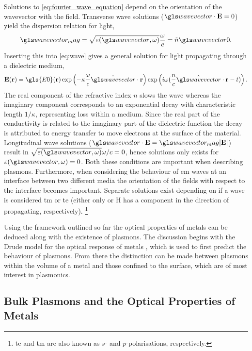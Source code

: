 \documentclass{article}
\begin{document}
Solutions to \eqref{eq:fourier_wave_equation} depend on the orientation of the wavevector with the field. Transverse wave solutions ($\wv\cdot\vec{E}=0$) yield the dispersion relation for light,
\begin{equation}
	\wvm = \sqrt{\eps(\wv, \omega)}\frac{\omega}{c}=\refind\wvz.
	\label{eq:light_dispersion}
\end{equation}
Inserting this into \eqref{eq:wave} gives a general solution for light propagating through a dielectric medium,
\begin{equation}
	\vec{E}(\vec{r}) = \gls{E0}(\vec{r}) \exp\left({-\kappa\frac{\omega}{c}\hat{\wv}\cdot\vec{r}}\right) \exp\left({i\omega(\frac{n}{c} \hat{\wv}\cdot\vec{r} - t)}\right).
	\label{eq:gen_wave_solution}
\end{equation}
The real component of the refractive index $n$ slows the wave whereas the imaginary component corresponds to an exponential decay with characteristic length $1/\kappa$, representing loss within a medium. Since the real part of the conductivity is related to the imaginary part of the dielectric function the decay is attributed to energy transfer to move electrons at the surface of the material.
Longitudinal wave solutions ($\wv\cdot\vec{E} = \wvm|\vec{E}|$) result in $\sqrt{\eps(\wv,\omega)}\omega/c = 0$, hence solutions only exists for $\eps(\wv, \omega)=0$. Both these conditions are important when describing plasmons.
Furthermore, when considering the behaviour of \gls{em} waves at an interface between two different media the orientation of the fields with respect to the interface becomes important. Separate solutions exist depending on if a wave is considered \gls{tm} or \gls{te} (either only  or \gls{H} has a component in the direction of propagating, respectively).%
\footnote{\gls{te} and \gls{tm} are also known as $s$- and $p$-polarisations, respectively.}

Using the framework outlined so far the optical properties of metals can be deduced along with the existence of plasmons. The discussion begins with the Drude model for the optical response of metals \cite{drude1900}, which is used to first predict the behaviour of plasmons. From there the distinction can be made between plasmons within the volume of a metal and those confined to the surface, which are of most interest in plasmonics.

\subsection{Bulk Plasmons and the Optical Properties of Metals}
\end{document}
